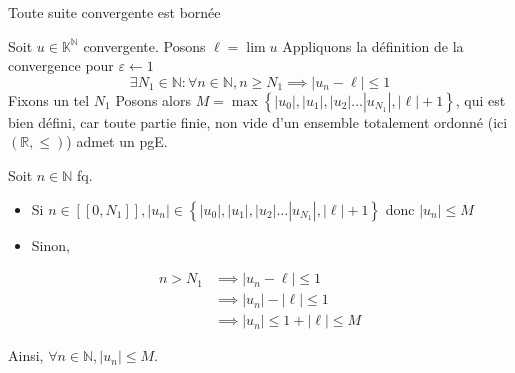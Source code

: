\documentclass{article}
\begin{document}
\begin{question_kholle}{Toute suite convergente est bornée}

  Soit $u \in \mathbb{K}^{\mathbb{N}}$ convergente.
  Posons $\ell = \lim u$
  Appliquons la définition de la convergence pour $\varepsilon \leftarrow 1$
  $$
    \exists N_{1}\in \mathbb{N}: \forall n \in \mathbb{N}, n \geqslant N_{1} \implies |u_{n}-\ell| \leqslant 1
  $$
  Fixons un tel $N_{1}$
  Posons alors $M = \max\left\{ |u_{0}|, |u_{1}|, |u_{2}| \dots |u_{N_{1}}|, |\ell|+1 \right\}$, qui est bien défini, car toute partie finie, non vide d'un ensemble totalement ordonné (ici $(\mathbb{R}, \leqslant)$) admet un pgE.

  Soit $n \in \mathbb{N}$ fq.
  \begin{itemize}
    \item Si $n \in [\! [0, N_{1}]\!], |u_{n}| \in \left\{ |u_{0}|, |u_{1}|, |u_{2}| \dots |u_{N_{1}}|, |\ell|+1 \right\}$ donc $|u_{n}| \leqslant M$
    \item Sinon,
  \end{itemize}

  \begin{align*}
    n> N_{1} & \implies |u_{n} - \ell| \leqslant 1              \\
             & \implies |u_{n}| - |\ell| \leqslant 1            \\
             & \implies |u_{n}| \leqslant 1+ |\ell| \leqslant M
  \end{align*}

  Ainsi, $\forall n \in \mathbb{N}, |u_{n}| \leqslant M$.
\end{question_kholle}


\pagebreak
\end{document}
